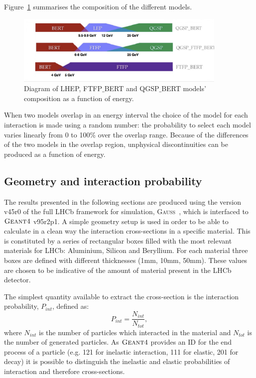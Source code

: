 Figure~\ref{fig:models} summarises the composition of the different models.
%
\begin{center}
\begin{figure}[b]
\centering \includegraphics[width=0.9\textwidth,trim={0 1mm 0 0},clip]{detector/figs/validation/models.png}
\caption{Diagram of LHEP, FTFP$\_$BERT and QGSP$\_$BERT models' composition as a function of energy.}
\label{fig:models}
\end{figure}
\end{center}
%
When two models overlap in an energy interval the choice of the model
for each interaction is made using a random number: the probability to select each model varies linearly
from 0 to 100\% over the overlap range. Because of the differences of the two models in the overlap region,
unphysical discontinuities can be produced as a function of energy.

\subsection{Geometry and interaction probability}
\label{GeomandPint}

The results presented in the following sections are produced using the version v45r0 of the full LHCb framework
for simulation, \textsc{Gauss}~\cite{LHCb-PROC-2011-006}, which is interfaced to $\textsc{Geant4}$ v95r2p1.
A simple geometry setup is used in order to be able to calculate in a clean way the interaction cross-sections
in a specific material. This is constituted by a series of rectangular boxes filled with the most relevant materials
for LHCb: Aluminium, Silicon and Beryllium. For each material three boxes are defined with different thicknesses
(1mm, 10mm, 50mm). These values are chosen to be indicative of the amount of material present in the LHCb detector.

The simplest quantity available to extract the cross-section is the interaction probability, $P_{int}$, defined as:
%
\begin{equation}
P_{int} = \frac{N_{int}}{N_{tot}},
\end{equation}
%
where $N_{int}$ is the number of particles which interacted in the material and $N_{tot}$ is the number of generated particles.
As $\textsc{Geant4}$ provides an ID for the end process of a particle (e.g. 121 for inelastic interaction, 111 for elastic, 
201 for decay) it is possible to distinguish the inelastic and elastic probabilities of interaction and therefore cross-sections.

